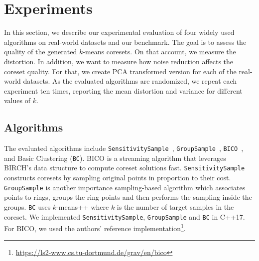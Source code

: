 \section{Experiments} \label{sec:experiments}
In this section, we describe our experimental evaluation of four widely used algorithms on real-world datasets and our benchmark. The goal is to assess the quality of the generated $k$-means coresets. On that account, we measure the distortion. In addition, we want to measure how noise reduction affects the coreset quality. For that, we create PCA transformed version for each of the real-world datasets. As the evaluated algorithms are randomized, we repeat each experiment ten times, reporting the mean distortion and variance for different values of $k$.


\subsection{Algorithms}
The evaluated algorithms include \texttt{SensitivitySample}~\cite{cohen2021new}, \texttt{GroupSample}~\cite{cohen2021new}, \texttt{BICO}~\cite{FGSSS13}, and Basic Clustering (\texttt{BC}). BICO is a streaming algorithm that leverages BIRCH's data structure to compute coreset solutions fast. \texttt{SensitivitySample} constructs coresets by sampling original points in proportion to their cost. \texttt{GroupSample} is another importance sampling-based algorithm which associates points to rings, groups the ring points and then performs the sampling inside the groups. \texttt{BC} uses $k$-means++ where $k$ is the number of target samples in the coreset. We implemented \texttt{SensitivitySample}, \texttt{GroupSample} and \texttt{BC} in C++17. For BICO, we used the authors' reference implementation\footnote{\url{https://ls2-www.cs.tu-dortmund.de/grav/en/bico}}. 

